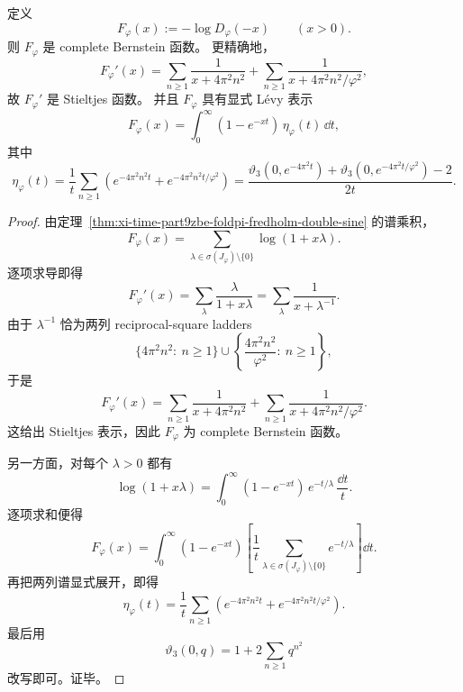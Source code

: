 \begin{theorem}\label{thm:xi-time-part9zbj-complete-bernstein-spectral-action}
定义
\[
F_\varphi(x):=-\log D_\varphi(-x)
\qquad (x>0).
\]
则 \(F_\varphi\) 是 complete Bernstein 函数。
更精确地，
\[
F_\varphi'(x)
=
\sum_{n\ge 1}\frac{1}{x+4\pi^2n^2}
+
\sum_{n\ge 1}\frac{1}{x+4\pi^2n^2/\varphi^2},
\]
故 \(F_\varphi'\) 是 Stieltjes 函数。
并且 \(F_\varphi\) 具有显式 L\'evy 表示
\[
F_\varphi(x)
=
\int_0^\infty (1-e^{-xt})\,\eta_\varphi(t)\,\dd t,
\]
其中
\[
\eta_\varphi(t)
=
\frac{1}{t}
\sum_{n\ge 1}
\left(
e^{-4\pi^2n^2 t}
+
e^{-4\pi^2n^2 t/\varphi^2}
\right)
=
\frac{\vartheta_3(0,e^{-4\pi^2 t})+\vartheta_3(0,e^{-4\pi^2 t/\varphi^2})-2}{2t}.
\]
\end{theorem}
\begin{proof}
由定理~\ref{thm:xi-time-part9zbe-foldpi-fredholm-double-sine} 的谱乘积，
\[
F_\varphi(x)
=
\sum_{\lambda\in \sigma(J_\varphi)\setminus\{0\}}\log(1+x\lambda).
\]
逐项求导即得
\[
F_\varphi'(x)
=
\sum_{\lambda}\frac{\lambda}{1+x\lambda}
=
\sum_{\lambda}\frac{1}{x+\lambda^{-1}}.
\]
由于 \(\lambda^{-1}\) 恰为两列 reciprocal-square ladders
\[
\{4\pi^2n^2:\ n\ge 1\}
\cup
\left\{\frac{4\pi^2n^2}{\varphi^2}:\ n\ge 1\right\},
\]
于是
\[
F_\varphi'(x)
=
\sum_{n\ge 1}\frac{1}{x+4\pi^2n^2}
+
\sum_{n\ge 1}\frac{1}{x+4\pi^2n^2/\varphi^2}.
\]
这给出 Stieltjes 表示，因此 \(F_\varphi\) 为 complete Bernstein 函数。

另一方面，对每个 \(\lambda>0\) 都有
\[
\log(1+x\lambda)
=
\int_0^\infty (1-e^{-xt})\,e^{-t/\lambda}\,\frac{\dd t}{t}.
\]
逐项求和便得
\[
F_\varphi(x)
=
\int_0^\infty (1-e^{-xt})
\left[
\frac{1}{t}
\sum_{\lambda\in \sigma(J_\varphi)\setminus\{0\}}e^{-t/\lambda}
\right]\dd t.
\]
再把两列谱显式展开，即得
\[
\eta_\varphi(t)
=
\frac{1}{t}
\sum_{n\ge 1}
\left(
e^{-4\pi^2n^2 t}
+
e^{-4\pi^2n^2 t/\varphi^2}
\right).
\]
最后用
\[
\vartheta_3(0,q)=1+2\sum_{n\ge 1}q^{n^2}
\]
改写即可。证毕。
\end{proof}

